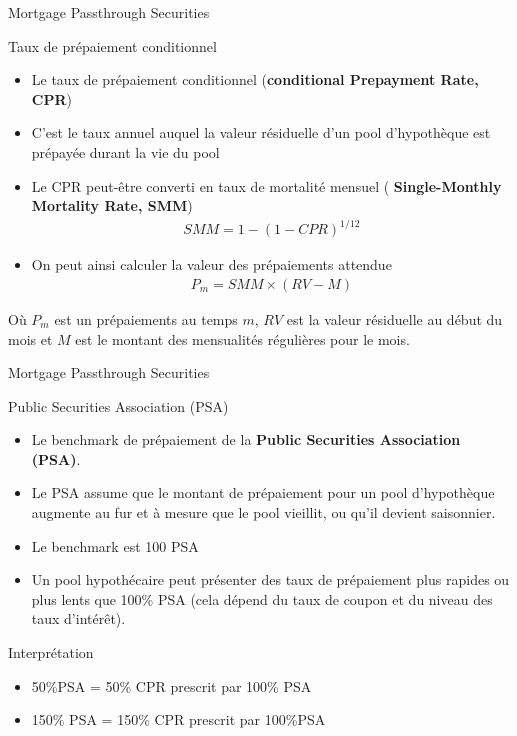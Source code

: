 \documentclass{beamer}
\begin{document}
\begin{frame}{Mortgage Passthrough Securities}
\begin{block}{Taux de prépaiement conditionnel}
\begin{itemize}[label=\bullet]
\item Le taux de prépaiement conditionnel (\textbf{conditional Prepayment Rate, CPR})
\item C’est le taux annuel auquel la valeur résiduelle d’un pool d’hypothèque est prépayée durant la vie du pool
\item Le CPR peut-être converti en taux de mortalité mensuel ( \textbf{Single-Monthly Mortality Rate, SMM})
\begin{align*}
SMM=1-(1-CPR)^{1/12}
\end{align*}
\item On peut ainsi calculer la valeur des prépaiements attendue
\begin{align*}
P_m=SMM \times (RV-M)
\end{align*}
\end{itemize}
Où $P_m$ est un prépaiements au temps $m$,  $RV$ est la valeur résiduelle au début du mois et $M$ est le montant des mensualités régulières pour le mois.
\end{block}
\end{frame}


\begin{frame}{Mortgage Passthrough Securities}
\begin{block}{Public Securities Association (PSA)}
\begin{itemize}[label=\bullet]
\item Le benchmark de prépaiement de la \textbf{Public Securities Association (PSA)}.
\item Le PSA assume que le montant de prépaiement pour un pool d’hypothèque augmente au fur et à mesure que le pool vieillit, ou qu’il devient saisonnier.
\item Le benchmark est 100 PSA
\item Un pool hypothécaire peut présenter des taux de prépaiement plus rapides ou plus lents que 100\% PSA (cela dépend du taux de coupon et du niveau des taux d’intérêt).
\end{itemize}
\end{block}
\begin{block}{Interprétation}
\begin{itemize}[label=\bullet]
\item 50\%PSA = 50\% CPR prescrit par 100\% PSA
\item 150\% PSA = 150\% CPR prescrit par 100\%PSA
\end{itemize}
\end{block}
\end{frame}
\end{document}
